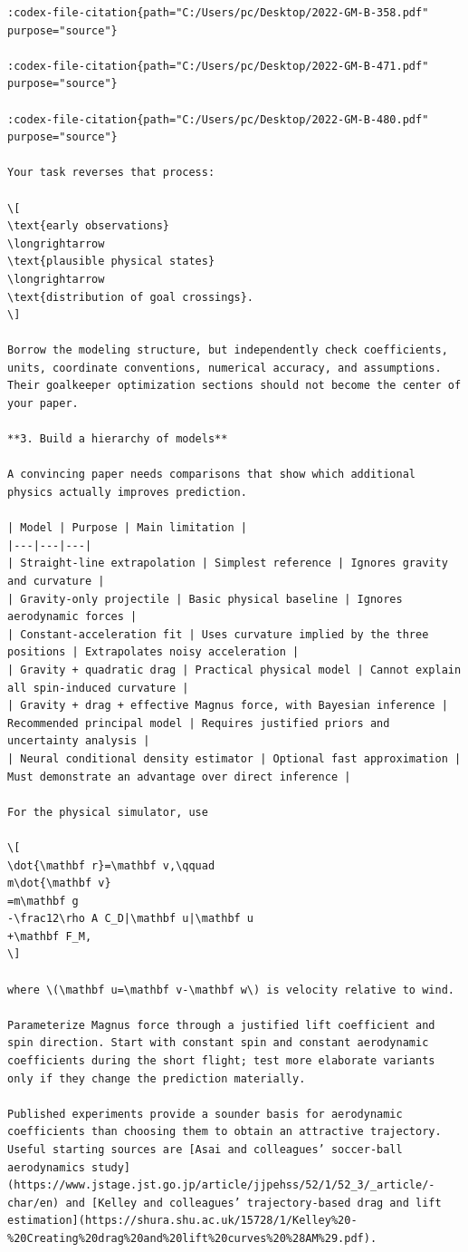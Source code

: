 \documentclass[UTF8,10pt]{ctexart}
\begin{document}
\begin{Verbatim}[breaklines=true,breakanywhere=true,fontsize=\scriptsize,frame=single,framesep=2pt]
:codex-file-citation{path="C:/Users/pc/Desktop/2022-GM-B-358.pdf" purpose="source"}

:codex-file-citation{path="C:/Users/pc/Desktop/2022-GM-B-471.pdf" purpose="source"}

:codex-file-citation{path="C:/Users/pc/Desktop/2022-GM-B-480.pdf" purpose="source"}

Your task reverses that process:

\[
\text{early observations}
\longrightarrow
\text{plausible physical states}
\longrightarrow
\text{distribution of goal crossings}.
\]

Borrow the modeling structure, but independently check coefficients, units, coordinate conventions, numerical accuracy, and assumptions. Their goalkeeper optimization sections should not become the center of your paper.

**3. Build a hierarchy of models**

A convincing paper needs comparisons that show which additional physics actually improves prediction.

| Model | Purpose | Main limitation |
|---|---|---|
| Straight-line extrapolation | Simplest reference | Ignores gravity and curvature |
| Gravity-only projectile | Basic physical baseline | Ignores aerodynamic forces |
| Constant-acceleration fit | Uses curvature implied by the three positions | Extrapolates noisy acceleration |
| Gravity + quadratic drag | Practical physical model | Cannot explain all spin-induced curvature |
| Gravity + drag + effective Magnus force, with Bayesian inference | Recommended principal model | Requires justified priors and uncertainty analysis |
| Neural conditional density estimator | Optional fast approximation | Must demonstrate an advantage over direct inference |

For the physical simulator, use

\[
\dot{\mathbf r}=\mathbf v,\qquad
m\dot{\mathbf v}
=m\mathbf g
-\frac12\rho A C_D|\mathbf u|\mathbf u
+\mathbf F_M,
\]

where \(\mathbf u=\mathbf v-\mathbf w\) is velocity relative to wind.

Parameterize Magnus force through a justified lift coefficient and spin direction. Start with constant spin and constant aerodynamic coefficients during the short flight; test more elaborate variants only if they change the prediction materially.

Published experiments provide a sounder basis for aerodynamic coefficients than choosing them to obtain an attractive trajectory. Useful starting sources are [Asai and colleagues’ soccer-ball aerodynamics study](https://www.jstage.jst.go.jp/article/jjpehss/52/1/52_3/_article/-char/en) and [Kelley and colleagues’ trajectory-based drag and lift estimation](https://shura.shu.ac.uk/15728/1/Kelley%20-%20Creating%20drag%20and%20lift%20curves%20%28AM%29.pdf).


\end{Verbatim}
\end{document}
